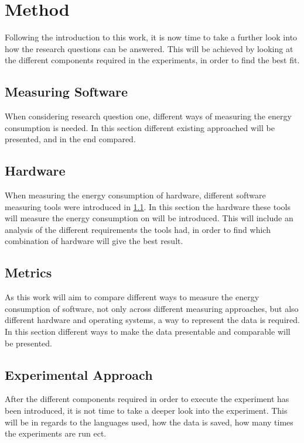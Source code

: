 \chapter{Method}\label{ch:method}

Following the introduction to this work, it is now time to take a further look into how the research questions can be answered. This will be achieved by looking at the different components required in the experiments, in order to find the best fit.

\section{Measuring Software}\label{sec:measuring_software}

When considering research question one, different ways of measuring the energy consumption is needed. In this section different existing approached will be presented, and in the end compared.






\section{Hardware}\label{sec:hardware}

When measuring the energy consumption of hardware, different software measuring tools were introduced in \cref{sec:measuring_software}. In this section the hardware these tools will measure the energy consumption on will be introduced. This will include an analysis of the different requirements the tools had, in order to find which combination of hardware will give the best result.

\section{Metrics}\label{sec:metrics}

As this work will aim to compare different ways to measure the energy consumption of software, not only across different measuring approaches, but also different hardware and operating systems, a way to represent the data is required. In this section different ways to make the data presentable and comparable will be presented.

\section{Experimental Approach}\label{sec:experimental_approach}

After the different components required in order to execute the experiment has been introduced, it is not time to take a deeper look into the experiment. This will be in regards to the languages used, how the data is saved, how many times the experiments are run ect.


